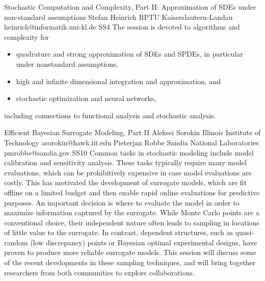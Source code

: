 \documentclass[12pt,a4paper,figuresright]{book}
\begin{document}
\begin{session}
 {Stochastic Computation and Complexity, Part II: Approximation of SDEs under non-standard assumptions}%
 {Stefan Heinrich}%
 {RPTU Kaiserslautern-Landau}%
 {heinrich@informatik.uni-kl.de}%
 {}%
 {}%
 {}%
 {SS4}
 {}%
The session is devoted to algorithms and complexity for
\begin{itemize}[itemsep=0pt,topsep=0pt]
 \item quadrature and strong approximation of SDEs and SPDEs, in particular under nonstandard assumptions,

 \item high and infinite dimensional integration and approximation, and

 \item stochastic optimization and neural networks,
\end{itemize}
including connections to functional analysis and stochastic analysis.
\end{session}





\clearpage

\begin{session}
 {Efficient Bayesian Surrogate Modeling, Part II}%
 {Aleksei Sorokin}%
 {Illinois Institute of Technology}%
 {asorokin@hawk.iit.edu}%
 {Pieterjan Robbe}%
 {Sandia National Laboratories}%
 {pmrobbe@sandia.gov}%
 {SS10}%
 {}%
 Common tasks in stochastic modeling include model calibration and sensitivity analysis. These tasks typically require many model evaluations, which can be prohibitively expensive in case model evaluations are costly. This has motivated the development of surrogate models, which are fit offline on a limited budget and then enable rapid online evaluations for predictive purposes. An important decision is where to evaluate the model in order to maximize information captured by the surrogate. While Monte Carlo points are a conventional choice, their independent nature often leads to sampling in locations of little value to the surrogate. In contrast, dependent structures, such as quasi-random (low discrepancy) points or Bayesian optimal experimental designs, have proven to produce more reliable surrogate models. This session will discuss some of the recent developments in these sampling techniques, and will bring together researchers from both communities to explore collaborations.
\end{session}
\end{document}
